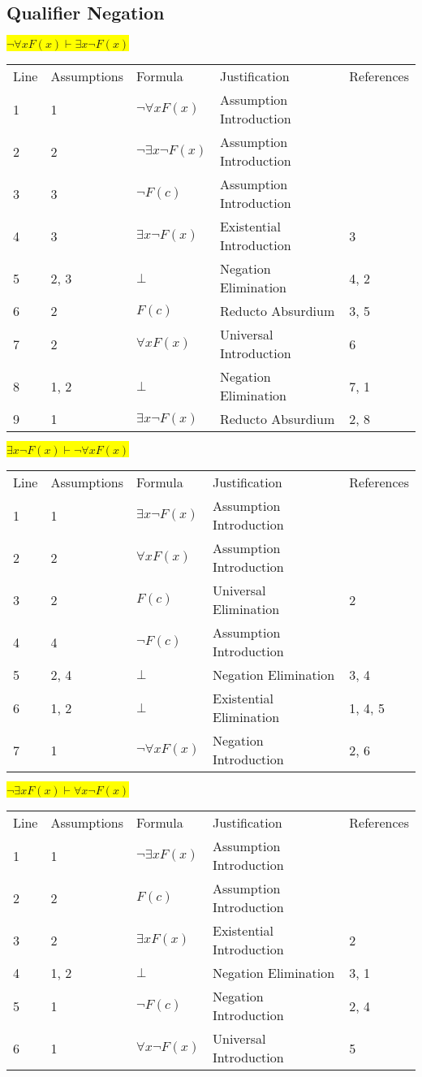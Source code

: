 \documentclass[12pt]{article}
\newcommand{\pr}[1]{\bigbreak \colorbox{Yellow}{$#1$} \smallbreak}
\begin{document}
\begin{flushleft}
\section{Qualifier Negation}
\pr{\neg \forall x F(x) \vdash \exists x \neg F(x)}
\begin{tabular}{lllll}
    Line & Assumptions & Formula & Justification & References \\
    1 & 1 & $\neg \forall xF(x)$  & Assumption Introduction &  \\
    2 & 2 & $\neg \exists x\neg F(x)$  & Assumption Introduction &  \\
    3 & 3 & $\neg F(c)$  & Assumption Introduction &  \\
    4 & 3 & $\exists x\neg F(x)$  & Existential Introduction & 3 \\
    5 & 2, 3 & $\bot $  & Negation Elimination & 4, 2 \\
    6 & 2 & $F(c)$  & Reducto Absurdium & 3, 5 \\
    7 & 2 & $\forall xF(x)$  & Universal Introduction & 6 \\
    8 & 1, 2 & $\bot $  & Negation Elimination & 7, 1 \\
    9 & 1 & $\exists x\neg F(x)$  & Reducto Absurdium & 2, 8 \\
\end{tabular}

\pr{\exists x \neg F(x) \vdash \neg \forall x F(x)}
\begin{tabular}{lllll}
    Line & Assumptions & Formula & Justification & References \\
    1 & 1 & $\exists x\neg F(x)$  & Assumption Introduction &  \\
    2 & 2 & $\forall xF(x)$  & Assumption Introduction &  \\
    3 & 2 & $F(c)$  & Universal Elimination & 2 \\
    4 & 4 & $\neg F(c)$  & Assumption Introduction &  \\
    5 & 2, 4 & $\bot $  & Negation Elimination & 3, 4 \\
    6 & 1, 2 & $\bot $  & Existential Elimination & 1, 4, 5 \\
    7 & 1 & $\neg \forall xF(x)$  & Negation Introduction & 2, 6 \\
\end{tabular}

\pr{\neg \exists x F(x) \vdash \forall x \neg F(x)}
\begin{tabular}{lllll}
    Line & Assumptions & Formula & Justification & References \\
    1 & 1 & $\neg \exists xF(x)$  & Assumption Introduction &  \\
    2 & 2 & $F(c)$  & Assumption Introduction &  \\
    3 & 2 & $\exists xF(x)$  & Existential Introduction & 2 \\
    4 & 1, 2 & $\bot $  & Negation Elimination & 3, 1 \\
    5 & 1 & $\neg F(c)$  & Negation Introduction & 2, 4 \\
    6 & 1 & $\forall x\neg F(x)$  & Universal Introduction & 5 \\
\end{tabular}


\end{flushleft}
\end{document}
